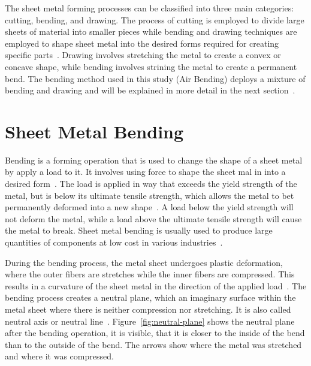 The sheet metal forming processes can be classified into three main categories: cutting, bending, and drawing.
The process of cutting is employed to divide large sheets of material into smaller pieces while bending and drawing
techniques are employed to shape sheet metal into the desired forms required for creating specific
parts~\cite[pp. 405]{groover_fundamentalsmodernmanufacturing_2020}.
Drawing involves stretching the metal to create a convex or concave shape, while bending involves strining the metal
to create a permanent bend.
The bending method used in this study (Air Bending) deploys a mixture of bending and drawing and will be
explained in more detail in the next section~\cite[pp. 416]{groover_fundamentalsmodernmanufacturing_2020}.


\section{Sheet Metal Bending}\label{sec:bending}
Bending is a forming operation that is used to change the shape of a sheet metal by
apply a load to it.
It involves using force to shape the sheet mal in into a desired form~\cite[p. 1]{dib_singleensembleclassifiers_2020}.
The load is applied in way that exceeds the yield strength of the metal, but is below its
ultimate tensile strength, which allows the metal to bet permanently deformed into a
new shape~\cite[p. 1]{baig_machinelearningprediction_2021}.
A load below the yield strength will not deform the metal, while a load above the ultimate tensile strength will
cause the metal to break.
Sheet metal bending is usually used to produce large quantities of components at low cost in various
industries~\cite[p. 1]{dib_singleensembleclassifiers_2020}.

During the bending process, the metal sheet undergoes plastic deformation, where the outer fibers are stretches while
the inner fibers are compressed.
This results in a curvature of the sheet metal in the direction of the applied
load~\cite[p. 3]{baig_machinelearningprediction_2021}.
The bending process creates a neutral plane, which an imaginary surface within the metal sheet where there is
neither compression nor stretching.
It is also called neutral axis or neutral line~\cite[pp. 67]{gustafson1998analytical}.
Figure~\ref{fig:neutral-plane} shows the neutral plane after the bending operation, it is
visible, that it is closer to the inside of the bend than to the outside of the bend.
The arrows show where the metal was stretched and where it was compressed.

